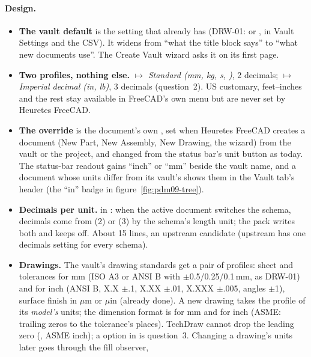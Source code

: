\paragraph{Design.}
\begin{itemize}[nosep]
  \item \textbf{The vault default} is the  setting that  already has (DRW-01:
         or , in Vault Settings and the CSV). It widens from ``what the title block says'' to ``what new
        documents use''. The Create Vault wizard asks it on its first page.
  \item \textbf{Two profiles, nothing else.}  $\mapsto$ \emph{Standard (mm, kg, s, \textdegree)}, 2 decimals;
         $\mapsto$ \emph{Imperial decimal (in, lb)}, 3 decimals (question~2). US customary, feet--inches and the
        rest stay available in FreeCAD's own menu but are never set by Heuretes FreeCAD.
  \item \textbf{The override} is the document's own , set when Heuretes FreeCAD creates a document (New Part,
        New Assembly, New Drawing, the wizard) from the vault or the project, and changed from the status bar's unit
        button as today. The status-bar readout gains ``inch'' or ``mm'' beside the vault name, and a document whose units
        differ from its vault's shows them in the Vault tab's header (the ``in'' badge in figure~\ref{fig:pdm09-tree}).
  \item \textbf{Decimals per unit.} \code{[BW]} in : when the active document switches the
        schema, decimals come from  (2) or  (3) by the schema's
        length unit; the pack writes both and keeps  off. About 15 lines, an upstream candidate
        (upstream has one decimals setting for every schema).
  \item \textbf{Drawings.} The vault's drawing standards get a pair of profiles: sheet and tolerances for mm (ISO A3 or
        ANSI B with $\pm$0.5/0.25/0.1\,mm, as DRW-01) and for inch (ANSI B, X.X $\pm$.1, X.XX $\pm$.01, X.XXX $\pm$.005,
        angles $\pm$1\textdegree), surface finish in $\mu$m or $\mu$in (already done). A new drawing takes the profile of
        its \emph{model's} units; the dimension format is  for mm and  for inch (ASME: trailing
        zeros to the tolerance's places). TechDraw cannot drop the leading zero (, ASME inch); a \code{[BW]}
        option in  is question~3. Changing a drawing's units later goes through the fill observer,

\end{itemize}

